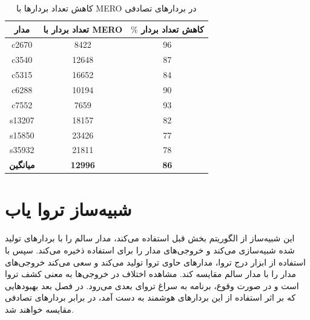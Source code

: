 \begin{table}[h]
	\centering
	\begin{tabular}{|c|c|c|}
		\hline
		{\bf مدار} & \multicolumn{1}{l|}{{\bf  تعداد بردار با MERO}} & \multicolumn{1}{l|}{{\bf  $\%$ کاهش تعداد بردار}} \\ \hline
		c2670      & 8422                                        & 96                                      \\ \hline
		c3540      & 12648                                       & 87                                      \\ \hline
		c5315      & 16652                                       & 84                                      \\ \hline
		c6288      & 10194                                       & 90                                      \\ \hline
		c7552      & 7659                                        & 93                                      \\ \hline
		s13207     & 18157                                       & 82                                      \\ \hline
		s15850     & 23426                                       & 77                                      \\ \hline
		s35932     & 21811                                       & 78                                      \\ \hline
		{\bf میانگین}  & {\bf 12996}                                 & {\bf 86}                                \\ \hline
	\end{tabular}
	\caption{کاهش تعداد بردارها با MERO در بردارهای تصادفی}
\end{table}







\section{شبیه‌ساز تروا یاب} 
این شبیه‌ساز از الگوریتم بخش قبل استفاده می‌کند، مدار سالم را با بردارهای تولید شده شبیه‌سازی می‌کند و خروجی‌های مدار را برای استفاده ذخیره می‌کند. سپس با استفاده از ابزار درج تروا، مدارهای حاوی تروا تولید می‌کند و سعی می‌کند خروجی‌های مدار را با مدار سالم مقایسه کند. مشاهده اختلاف در خروجی‌ها به معنی کشف تروا است و در صورت وقوع، برنامه به سراغ تروای بعدی می‌رود. در فصل بعد بهبودهایی که بر اثر استفاده از این بردارهای هوشمند به دست آمد، در برابر بردارهای تصادفی مقایسه خواهند شد.
